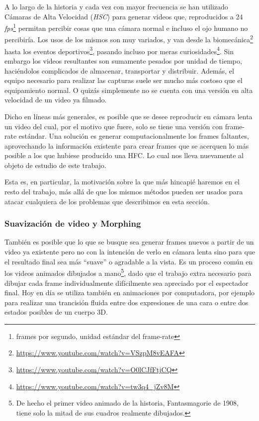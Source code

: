 A lo largo de la historia y cada vez con mayor frecuencia se han utilizado Cámaras de Alta Velocidad (\emph{HSC}) para generar videos que, reproducidos a 24 \emph{fps}\footnote{frames por segundo, unidad estándar del frame-rate} permitan percibir cosas que una cámara normal e incluso el ojo humano no percibiría. Los usos de los mismos son muy variados, y van desde la biomecánica\footnote{\url{https://www.youtube.com/watch?v=VSzpM8vEAFA}} hasta los eventos deportivos\footnote{\url{https://www.youtube.com/watch?v=O0lCJfFtjCQ}}, pasando incluso por meras curiosidades\footnote{\url{https://www.youtube.com/watch?v=tw3q4_jZv8M}}. Sin embargo los videos resultantes son sumamente pesados por unidad de tiempo, haciéndolos complicados de almacenar, transportar y distribuir. Además, el equipo necesario para realizar las capturas suele ser mucho más costoso que el equipamiento normal. O quizás simplemente no se cuenta con una versión en alta velocidad de un video ya filmado.

Dicho en líneas más generales, es posible que se desee reproducir en cámara lenta un video del cual, por el motivo que fuere, solo se tiene una versión con frame-rate estándar. Una solución es generar computacionalmente los frames faltantes, aprovechando la información existente para crear frames que se acerquen lo más posible a los que hubiese producido una HFC. Lo cual nos lleva nuevamente al objeto de estudio de este trabajo.

Esta es, en particular, la motivación sobre la que más hincapié haremos en el resto del trabajo, más allá de que los mismos métodos pueden ser usados para atacar cualquiera de los problemas que describimos en esta sección.

\subsubsection{Suavización de video y Morphing}
También es posible que lo que se busque sea generar frames nuevos a partir de un video ya existente pero no con la intención de verlo en cámara lenta sino para que el resultado final sea más ``suave'' o agradable a la vista. Es un proceso común en los videos animados dibujados a mano\footnote{De hecho el primer video animado de la historia, Fantasmagorie de 1908, tiene solo la mitad de sus cuadros realmente dibujados.}, dado que el trabajo extra necesario para dibujar cada frame individualmente difícilmente sea apreciado por el espectador final. Hoy en día se utiliza también en animaciones por computadora, por ejemplo para realizar una trancisión fluida entre dos expresiones de una cara o entre dos estados posibles de un cuerpo 3D.

